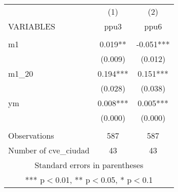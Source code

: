 \begin{tabular}{lcc} \hline
 & (1) & (2) \\
VARIABLES & ppu3 & ppu6 \\ \hline
 &  &  \\
m1 & 0.019** & -0.051*** \\
 & (0.009) & (0.012) \\
m1\_20 & 0.194*** & 0.151*** \\
 & (0.028) & (0.038) \\
ym & 0.008*** & 0.005*** \\
 & (0.000) & (0.000) \\
 &  &  \\
Observations & 587 & 587 \\
 Number of cve\_ciudad & 43 & 43 \\ \hline
\multicolumn{3}{c}{ Standard errors in parentheses} \\
\multicolumn{3}{c}{ *** p$<$0.01, ** p$<$0.05, * p$<$0.1} \\
\end{tabular}
